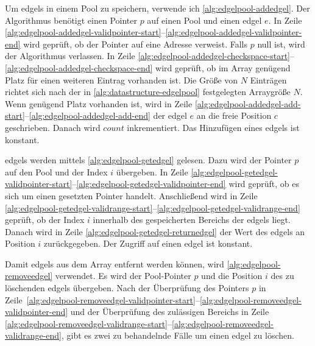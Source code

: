 



Um \glspl{edgel} in einem Pool zu speichern, verwende ich \autoref{alg:edgelpool-addedgel}. Der Algorithmus benötigt
 einen Pointer $p$ auf einen Pool und einen \gls{edgel} $e$. In Zeile
 \ref{alg:edgelpool-addedgel-validpointer-start}--\ref{alg:edgelpool-addedgel-validpointer-end} wird geprüft, ob der
 Pointer auf eine Adresse verweist. Falls $p$ null ist, wird der Algorithmus verlassen. In Zeile
 \ref{alg:edgelpool-addedgel-checkspace-start}--\ref{alg:edgelpool-addedgel-checkspace-end} wird geprüft, ob im Array
 genügend Platz für einen weiteren Eintrag vorhanden ist. Die Größe von $N$ Einträgen richtet sich nach der in \autoref{alg:datastructure-edgelpool} festgelegten Arraygröße $N$. Wenn genügend Platz vorhanden ist, wird in Zeile
 \ref{alg:edgelpool-addedgel-add-start}--\ref{alg:edgelpool-addedgel-add-end} der \gls{edgel} $e$ an die freie
 Position $c$ geschrieben. Danach wird $\mathit{count}$ inkrementiert. Das Hinzufügen eines \glspl{edgel} ist konstant.



\glspl{edgel} werden mittels \autoref{alg:edgelpool-getedgel} gelesen. Dazu wird der Pointer $p$ auf den Pool und der
 Index $i$ übergeben. In Zeile
 \ref{alg:edgelpool-getedgel-validpointer-start}--\ref{alg:edgelpool-getedgel-validpointer-end} wird geprüft, ob es
 sich um einen gesetzten Pointer handelt. Anschließend wird in Zeile
 \ref{alg:edgelpool-getedgel-validrange-start}--\ref{alg:edgelpool-getedgel-validrange-end} geprüft, ob der Index $i$
 innerhalb des gespeicherten Bereichs der \glspl{edgel} liegt. Danach wird in Zeile
 \ref{alg:edgelpool-getedgel-returnedgel} der Wert des \glspl{edgel} an Position $i$ zurückgegeben. Der Zugriff auf
 einen \gls{edgel} ist konstant.



Damit \glspl{edgel} aus dem Array entfernt werden können, wird \autoref{alg:edgelpool-removeedgel} verwendet. Es wird
 der Pool-Pointer $p$ und die Position $i$ des zu löschenden \glspl{edgel} übergeben. Nach der Überprüfung des Pointers
 $p$ in Zeile~\ref{alg:edgelpool-removeedgel-validpointer-start}--\ref{alg:edgelpool-removeedgel-validpointer-end} und
 der Überprüfung des zulässigen Bereichs in Zeile
 \ref{alg:edgelpool-removeedgel-validrange-start}--\ref{alg:edgelpool-removeedgel-validrange-end}, gibt es zwei zu
 behandelnde Fälle um einen \gls{edgel} zu löschen.

